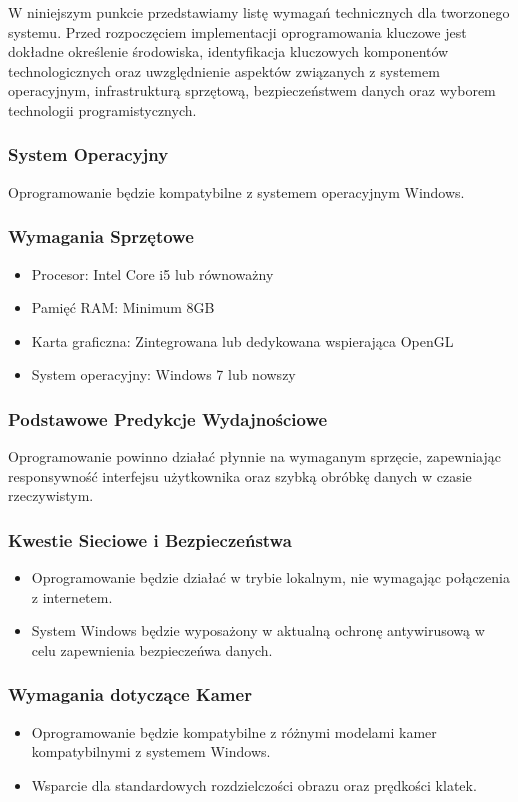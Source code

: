 W niniejszym punkcie przedstawiamy listę wymagań technicznych dla tworzonego systemu. 
Przed rozpoczęciem implementacji oprogramowania kluczowe jest dokładne określenie środowiska, 
identyfikacja kluczowych komponentów technologicznych oraz uwzględnienie aspektów związanych 
z systemem operacyjnym, infrastrukturą sprzętową, bezpieczeństwem danych oraz wyborem 
technologii programistycznych.

\subsubsection*{System Operacyjny}
Oprogramowanie będzie kompatybilne z systemem operacyjnym Windows.

\subsubsection*{Wymagania Sprzętowe} %
\begin{itemize}
    \item Procesor: Intel Core i5 lub równoważny
    \item Pamięć RAM: Minimum 8GB
    \item Karta graficzna: Zintegrowana lub dedykowana wspierająca OpenGL %
    \item System operacyjny: Windows 7 lub nowszy
\end{itemize}

\subsubsection*{Podstawowe Predykcje Wydajnościowe}
Oprogramowanie powinno działać płynnie na wymaganym sprzęcie, zapewniając responsywność 
interfejsu użytkownika oraz szybką obróbkę danych w czasie rzeczywistym.

\subsubsection*{Kwestie Sieciowe i Bezpieczeństwa}
\begin{itemize}
    \item Oprogramowanie będzie działać w trybie lokalnym, nie wymagając połączenia z internetem.
    \item System Windows będzie wyposażony w aktualną ochronę antywirusową w celu zapewnienia bezpieczeńwa danych.
\end{itemize}

\subsubsection*{Wymagania dotyczące Kamer}
\begin{itemize}
    \item Oprogramowanie będzie kompatybilne z różnymi modelami kamer kompatybilnymi z systemem Windows.
    \item Wsparcie dla standardowych rozdzielczości obrazu oraz prędkości klatek.
\end{itemize}

